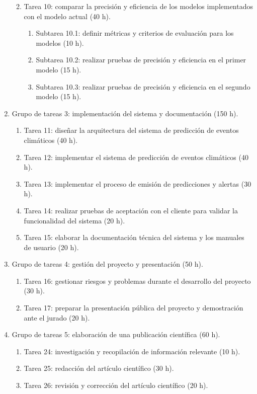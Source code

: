 \documentclass[
11pt, %
codirector, %
]{charter}
\begin{document}
\begin{enumerate}
\begin{enumerate}
\begin{enumerate}
	\end{enumerate}	
	\item Tarea 10: comparar la precisión y eficiencia de los modelos implementados con el modelo actual (40 h).
	\begin{enumerate}
	\item Subtarea 10.1: definir métricas y criterios de evaluación para los modelos (10 h).
	\item Subtarea 10.2: realizar pruebas de precisión y eficiencia en el primer modelo (15 h).
	\item Subtarea 10.3: realizar pruebas de precisión y eficiencia en el segundo modelo (15 h).
	\end{enumerate}
	\end{enumerate}
\item Grupo de tareas 3: implementación del sistema y documentación (150 h).
\begin{enumerate}
	\item Tarea 11: diseñar la arquitectura del sistema de predicción de eventos climáticos (40 h).
	\item Tarea 12: implementar el sistema de predicción de eventos climáticos (40 h).
	\item Tarea 13: implementar el proceso de emisión de predicciones y alertas (30 h).
	\item Tarea 14: realizar pruebas de aceptación con el cliente para validar la funcionalidad del sistema (20 h).
	\item Tarea 15: elaborar la documentación técnica del sistema y los manuales de usuario (20 h).
	\end{enumerate}
\item Grupo de tareas 4: gestión del proyecto y presentación (50 h).
\begin{enumerate}
	\item Tarea 16: gestionar riesgos y problemas durante el desarrollo del proyecto (30 h).
	\item Tarea 17: preparar la presentación pública del proyecto y demostración ante el jurado (20 h).
	\end{enumerate}
\item Grupo de tareas 5: elaboración de una publicación científica (60 h).
\begin{enumerate}
	\item Tarea 24: investigación y recopilación de información relevante (10 h).
	\item Tarea 25: redacción del artículo científico (30 h).
	\item Tarea 26: revisión y corrección del artículo científico (20 h).

\end{enumerate}
\end{enumerate}
\end{document}
